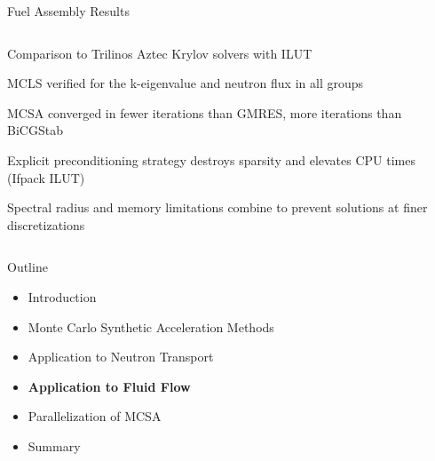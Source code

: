 \documentclass{beamer}
\begin{document}
\begin{frame}{Fuel Assembly Results}
\begin{columns}
    \begin{column}{0.5\textwidth}
      
      \begin{itemize}
        {\small
        \item Comparison to Trilinos Aztec Krylov solvers with ILUT
          \medskip
        \item MCLS verified for the k-eigenvalue and neutron flux in
          all groups
          \medskip
        \item MCSA converged in fewer iterations than GMRES, more
          iterations than BiCGStab
          \medskip
        \item Explicit preconditioning strategy destroys sparsity and
          elevates CPU times (Ifpack ILUT)
          \medskip
        \item Spectral radius and memory limitations combine to
          prevent solutions at finer discretizations
        }
      \end{itemize}

    \end{column}

  \end{columns}

\end{frame}

\begin{frame}{Outline}

  \begin{itemize}
  \item Introduction
    \bigskip
  \item Monte Carlo Synthetic Acceleration Methods
    \bigskip
  \item Application to Neutron Transport
    \bigskip
  \item \textbf{Application to Fluid Flow}
    \bigskip
  \item Parallelization of MCSA
    \bigskip
  \item Summary
  \end{itemize}

\end{frame}
\end{document}
